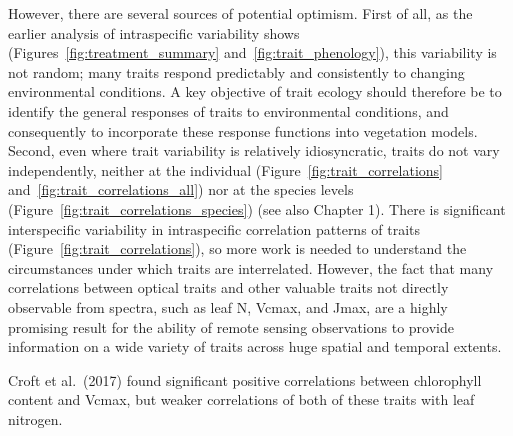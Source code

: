 However, there are several sources of potential optimism.
First of all, as the earlier analysis of intraspecific variability shows (Figures~\ref{fig:treatment_summary} and~\ref{fig:trait_phenology}), this variability is not random; many traits respond predictably and consistently to changing environmental conditions.
A key objective of trait ecology should therefore be to identify the general responses of traits to environmental conditions, and consequently to incorporate these response functions into vegetation models.
% 
% 
% 
Second, even where trait variability is relatively idiosyncratic, traits do not vary independently, neither at the individual (Figure~\ref{fig:trait_correlations} and~\ref{fig:trait_correlations_all}) nor at the species levels (Figure~\ref{fig:trait_correlations_species}) (see also Chapter 1).
There is significant interspecific variability in intraspecific correlation patterns of traits (Figure~\ref{fig:trait_correlations}), so more work is needed to understand the circumstances under which traits are interrelated.
% 
% 
However, the fact that many correlations between optical traits and other valuable traits not directly observable from spectra, such as leaf N, Vcmax, and Jmax, are a highly promising result for the ability of remote sensing observations to provide information on a wide variety of traits across huge spatial and temporal extents.

Croft et al.~(2017) \nocite{croft_2017_chlorophyll} found significant positive correlations between chlorophyll content and Vcmax, but weaker correlations of both of these traits with leaf nitrogen. %
